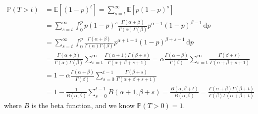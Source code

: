 \documentclass[letterpaper,11pt]{article}
\begin{document}
\begin{enumerate}
\begin{enumerate}
\begin{description}
        \begin{align}
          \mathbb{P}\left(T > t\right)          
          &= \mathbb{E}\left[
            (1 - p)^t
            \right]
            = \sum_{s=t}^\infty
            \mathbb{E}\left[
            p\left(1 - p\right)^s
            \right] \label{eqn:p2_survival_beta}\\
          &=
            \sum_{s=t}^\infty
            \int_0^p
            p\left(1-p\right)^s
            \frac{\Gamma\left(\alpha + \beta\right)}            
            {\Gamma\left(\alpha\right)\Gamma\left(\beta\right)}
            p^{\alpha - 1}\left(1-p\right)^{\beta-1}
            \,\mathrm{d}p
          \nonumber\\
          &= \sum_{s=t}^\infty
            \int_0^p
            \frac{\Gamma\left(\alpha + \beta\right)}
            {\Gamma\left(\alpha\right)\Gamma\left(\beta\right)}
            p^{\alpha + 1 - 1}\left(1-p\right)^{\beta + s -1}
            \,\mathrm{d}p \nonumber\\
          &= \frac{\Gamma\left(\alpha + \beta\right)} 
            {\Gamma\left(\alpha\right)\Gamma\left(\beta\right)}            
            \sum_{s=t}^\infty
            \frac
            {\Gamma\left(\alpha + 1\right)\Gamma\left(\beta + s\right)}
            {\Gamma\left(\alpha + \beta + s + 1\right)}
            = \alpha\frac{\Gamma\left(\alpha + \beta\right)} 
            {\Gamma\left(\beta\right)}
            \sum_{s=t}^\infty
            \frac
            {\Gamma\left(\beta + s\right)}
            {\Gamma\left(\alpha + \beta + s + 1\right)}
          \nonumber\\
          &= 
            1
            - \alpha
            \frac{\Gamma\left(\alpha + \beta\right)} 
            {\Gamma\left(\beta\right)}
            \sum_{s=0}^{t-1}
            \frac
            {\Gamma\left(\beta + s\right)}
            {\Gamma\left(\alpha + \beta + s + 1\right)} \nonumber\\
          &= 1 - \frac{1}{B\left(\alpha,\beta\right)}
            \sum_{s=0}^{t-1} B\left(\alpha + 1, \beta + s\right)
            = \frac{B\left(\alpha,\beta + t\right)}{B\left(\alpha,\beta\right)}
            = \frac{\Gamma\left(\alpha + \beta\right)\Gamma\left(\beta + t\right)}
            {\Gamma\left(\beta\right)\Gamma\left(\alpha + \beta + t\right)}
            \nonumber
        \end{align}
        where $B$ is the beta function, and we know
        $\mathbb{P}\left(T > 0\right) = 1$.


\end{description}
\end{enumerate}
\end{enumerate}
\end{document}
